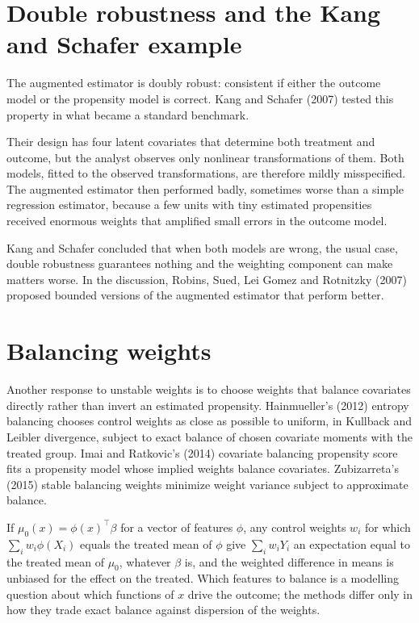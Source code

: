 \section{Double robustness and the Kang and Schafer example}

The augmented estimator is doubly robust: consistent if either the outcome model or the propensity model is correct. Kang and Schafer (2007) tested this property in what became a standard benchmark.

Their design has four latent covariates that determine both treatment and outcome, but the analyst observes only nonlinear transformations of them. Both models, fitted to the observed transformations, are therefore mildly misspecified. The augmented estimator then performed badly, sometimes worse than a simple regression estimator, because a few units with tiny estimated propensities received enormous weights that amplified small errors in the outcome model.

Kang and Schafer concluded that when both models are wrong, the usual case, double robustness guarantees nothing and the weighting component can make matters worse. In the discussion, Robins, Sued, Lei Gomez and Rotnitzky (2007) proposed bounded versions of the augmented estimator that perform better.

\section{Balancing weights}

Another response to unstable weights is to choose weights that balance covariates directly rather than invert an estimated propensity. Hainmueller's (2012) entropy balancing chooses control weights as close as possible to uniform, in Kullback and Leibler divergence, subject to exact balance of chosen covariate moments with the treated group. Imai and Ratkovic's (2014) covariate balancing propensity score fits a propensity model whose implied weights balance covariates. Zubizarreta's (2015) stable balancing weights minimize weight variance subject to approximate balance.

If $\mu_0(x) = \phi(x)^\top\beta$ for a vector of features $\phi$, any control weights $w_i$ for which $\sum_i w_i\phi(X_i)$ equals the treated mean of $\phi$ give $\sum_i w_iY_i$ an expectation equal to the treated mean of $\mu_0$, whatever $\beta$ is, and the weighted difference in means is unbiased for the effect on the treated. Which features to balance is a modelling question about which functions of $x$ drive the outcome; the methods differ only in how they trade exact balance against dispersion of the weights.

